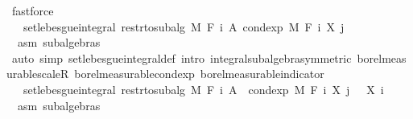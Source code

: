\begin{isabellebody}
\ fastforce\isanewline
\ \ \ \ \ \ \isamarkupfalse%
\ \isamarkupfalse%
\ {\isachardoublequoteopen}{\isachardot}{\kern0pt}{\isachardot}{\kern0pt}{\isachardot}{\kern0pt}\ {\isacharequal}{\kern0pt}\ set{\isacharunderscore}{\kern0pt}lebesgue{\isacharunderscore}{\kern0pt}integral\ {\isacharparenleft}{\kern0pt}restr{\isacharunderscore}{\kern0pt}to{\isacharunderscore}{\kern0pt}subalg\ M\ {\isacharparenleft}{\kern0pt}F\ i{\isacharparenright}{\kern0pt}{\isacharparenright}{\kern0pt}\ A\ {\isacharparenleft}{\kern0pt}cond{\isacharunderscore}{\kern0pt}exp\ M\ {\isacharparenleft}{\kern0pt}F\ i{\isacharparenright}{\kern0pt}\ {\isacharparenleft}{\kern0pt}X\ j{\isacharparenright}{\kern0pt}{\isacharparenright}{\kern0pt}{\isachardoublequoteclose}\ \isamarkupfalse%
\ {\isacharasterisk}{\kern0pt}\ asm\ subalgebras\ \isamarkupfalse%
\ {\isacharparenleft}{\kern0pt}auto\ simp{\isacharcolon}{\kern0pt}\ set{\isacharunderscore}{\kern0pt}lebesgue{\isacharunderscore}{\kern0pt}integral{\isacharunderscore}{\kern0pt}def\ intro{\isacharbang}{\kern0pt}{\isacharcolon}{\kern0pt}\ integral{\isacharunderscore}{\kern0pt}subalgebra{}{\isacharbrackleft}{\kern0pt}symmetric{\isacharbrackright}{\kern0pt}\ borel{\isacharunderscore}{\kern0pt}measurable{\isacharunderscore}{\kern0pt}scaleR\ borel{\isacharunderscore}{\kern0pt}measurable{\isacharunderscore}{\kern0pt}cond{\isacharunderscore}{\kern0pt}exp\ borel{\isacharunderscore}{\kern0pt}measurable{\isacharunderscore}{\kern0pt}indicator{\isacharparenright}{\kern0pt}\isanewline
\ \ \ \ \ \ \isamarkupfalse%
\ \isamarkupfalse%
\ {\isachardoublequoteopen}{}\ {\isasymle}\ set{\isacharunderscore}{\kern0pt}lebesgue{\isacharunderscore}{\kern0pt}integral\ {\isacharparenleft}{\kern0pt}restr{\isacharunderscore}{\kern0pt}to{\isacharunderscore}{\kern0pt}subalg\ M\ {\isacharparenleft}{\kern0pt}F\ i{\isacharparenright}{\kern0pt}{\isacharparenright}{\kern0pt}\ A\ {\isacharparenleft}{\kern0pt}{\isasymlambda}{\isasymxi}{\isachardot}{\kern0pt}\ cond{\isacharunderscore}{\kern0pt}exp\ M\ {\isacharparenleft}{\kern0pt}F\ i{\isacharparenright}{\kern0pt}\ {\isacharparenleft}{\kern0pt}X\ j{\isacharparenright}{\kern0pt}\ {\isasymxi}\ {\isacharminus}{\kern0pt}\ X\ i\ {\isasymxi}{\isacharparenright}{\kern0pt}{\isachardoublequoteclose}\ \isamarkupfalse%
\ {\isacharasterisk}{\kern0pt}\ asm\ subalgebras\ \isamarkupfalse%

\end{isabellebody}

